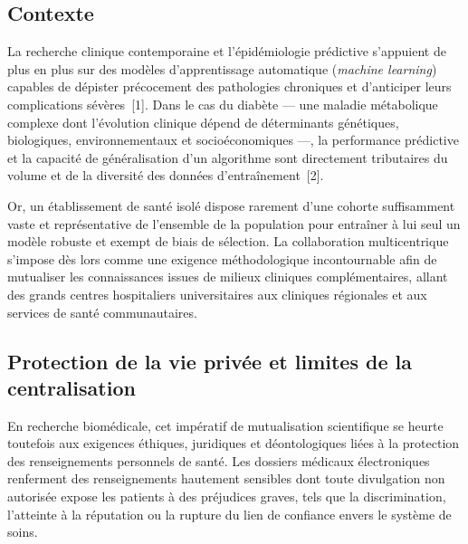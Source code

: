 \subsection{Contexte}
\label{sec:intro-contexte}

La recherche clinique contemporaine et l’épidémiologie prédictive s’appuient de plus en plus sur des modèles d’apprentissage automatique (\emph{machine learning}) capables de dépister précocement des pathologies chroniques et d’anticiper leurs complications sévères~[1]. Dans le cas du diabète --- une maladie métabolique complexe dont l’évolution clinique dépend de déterminants génétiques, biologiques, environnementaux et socioéconomiques ---, la performance prédictive et la capacité de généralisation d’un algorithme sont directement tributaires du volume et de la diversité des données d’entraînement~[2].

Or, un établissement de santé isolé dispose rarement d’une cohorte suffisamment vaste et représentative de l’ensemble de la population pour entraîner à lui seul un modèle robuste et exempt de biais de sélection. La collaboration multicentrique s’impose dès lors comme une exigence méthodologique incontournable afin de mutualiser les connaissances issues de milieux cliniques complémentaires, allant des grands centres hospitaliers universitaires aux cliniques régionales et aux services de santé communautaires.

\subsection{Protection de la vie privée et limites de la centralisation}

En recherche biomédicale, cet impératif de mutualisation scientifique se heurte toutefois aux exigences éthiques, juridiques et déontologiques liées à la protection des renseignements personnels de santé. Les dossiers médicaux électroniques renferment des renseignements hautement sensibles dont toute divulgation non autorisée expose les patients à des préjudices graves, tels que la discrimination, l’atteinte à la réputation ou la rupture du lien de confiance envers le système de soins.

